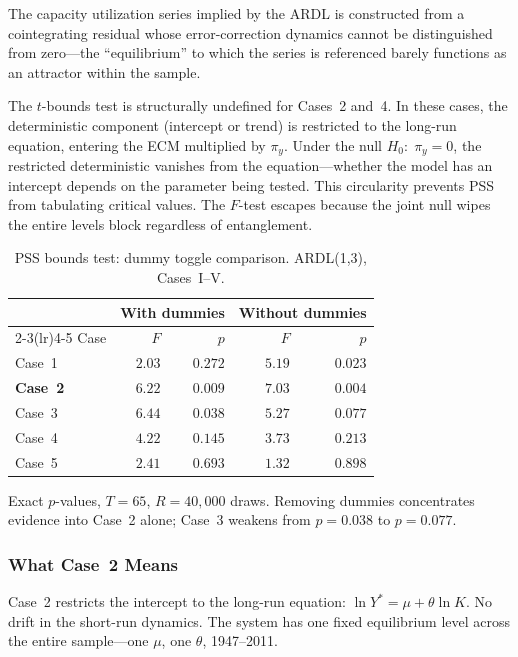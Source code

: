 \documentclass[11pt,a4paper]{article}
\begin{document}
The capacity utilization series implied by the ARDL is constructed from a cointegrating residual whose error-correction dynamics cannot be distinguished from zero---the ``equilibrium'' to which the series is referenced barely functions as an attractor within the sample.

The $t$-bounds test is structurally undefined for Cases~2 and~4. In these cases, the deterministic component (intercept or trend) is restricted to the long-run equation, entering the ECM multiplied by $\pi_y$. Under the null $H_0{:}\; \pi_y = 0$, the restricted deterministic vanishes from the equation---whether the model has an intercept depends on the parameter being tested. This circularity prevents PSS from tabulating critical values. The $F$-test escapes because the joint null wipes the entire levels block regardless of entanglement.


\begin{table}[!ht]
	\centering
	\small
	\caption{PSS bounds test: dummy toggle comparison. ARDL(1,3), Cases~I--V.}
	\label{tab:S1_bounds_toggle}
	\begin{tabular}{lrrrr}
		\toprule
		& \multicolumn{2}{c}{With dummies} & \multicolumn{2}{c}{Without dummies} \\
		\cmidrule(lr){2-3}\cmidrule(lr){4-5}
		Case & $F$ & $p$ & $F$ & $p$ \\
		\midrule
		Case~1 & $2.03$ & $0.272$ & $5.19$ & $0.023$ \\
		\textbf{Case~2} & $\bm{6.22}$ & $\bm{0.009}$ & $\bm{7.03}$ & $\bm{0.004}$ \\
		Case~3 & $6.44$ & $0.038$ & $5.27$ & $0.077$ \\
		Case~4 & $4.22$ & $0.145$ & $3.73$ & $0.213$ \\
		Case~5 & $2.41$ & $0.693$ & $1.32$ & $0.898$ \\
		\bottomrule
	\end{tabular}
	\par\vspace{0.3em}
	\footnotesize Exact $p$-values, $T=65$, $R=40{,}000$ draws. Removing dummies concentrates evidence into Case~2 alone; Case~3 weakens from $p=0.038$ to $p=0.077$.
\end{table}


\subsubsection{What Case~2 Means}

Case~2 restricts the intercept to the long-run equation: $\ln Y^* = \mu + \theta \ln K$. No drift in the short-run dynamics. The system has one fixed equilibrium level across the entire sample---one $\mu$, one $\theta$, 1947--2011.
\end{document}
